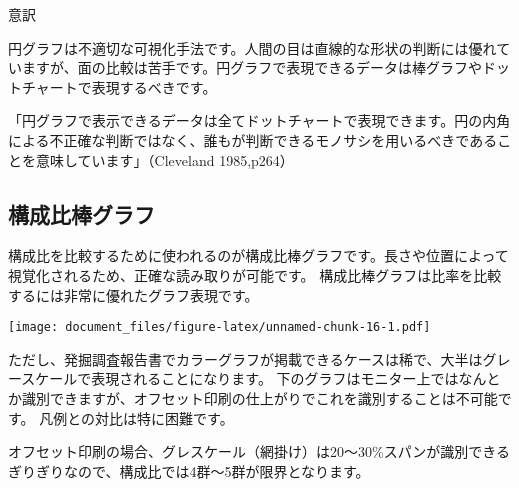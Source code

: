 \documentclass[]{article}
\newenvironment{Shaded}{\begin{snugshade}}{\end{snugshade}}
\newcommand{\DataTypeTok}[1]{\textcolor[rgb]{0.13,0.29,0.53}{#1}}
\newcommand{\KeywordTok}[1]{\textcolor[rgb]{0.13,0.29,0.53}{\textbf{#1}}}
\newcommand{\NormalTok}[1]{#1}
\newcommand{\OperatorTok}[1]{\textcolor[rgb]{0.81,0.36,0.00}{\textbf{#1}}}
\newcommand{\StringTok}[1]{\textcolor[rgb]{0.31,0.60,0.02}{#1}}
\begin{document}
意訳

円グラフは不適切な可視化手法です。人間の目は直線的な形状の判断には優れていますが、面の比較は苦手です。円グラフで表現できるデータは棒グラフやドットチャートで表現するべきです。

「円グラフで表示できるデータは全てドットチャートで表現できます。円の内角による不正確な判断ではなく、誰もが判断できるモノサシを用いるべきであることを意味しています」（Cleveland
1985,p264）

\subsection{構成比棒グラフ}

構成比を比較するために使われるのが構成比棒グラフです。長さや位置によって視覚化されるため、正確な読み取りが可能です。
構成比棒グラフは比率を比較するには非常に優れたグラフ表現です。

\begin{Shaded}
\end{Shaded}

\texttt{[image: document\_files/figure-latex/unnamed-chunk-16-1.pdf]}

ただし、発掘調査報告書でカラーグラフが掲載できるケースは稀で、大半はグレースケールで表現されることになります。
下のグラフはモニター上ではなんとか識別できますが、オフセット印刷の仕上がりでこれを識別することは不可能です。
凡例との対比は特に困難です。

オフセット印刷の場合、グレスケール（網掛け）は20〜30\%スパンが識別できるぎりぎりなので、構成比では4群〜5群が限界となります。
\end{document}

